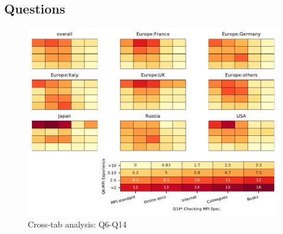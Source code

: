 
\subsection{Questions}


\begin{figure}
\begin{center}
\includegraphics[width=12cm]{../pdfs/Q6-Q14.pdf}
\caption{Cross-tab analysis: Q6-Q14}
\label{fig:Q6-Q14}
\end{center}
\end{figure}
